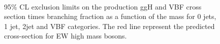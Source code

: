 \begin{figure}[htb]
\centering
{}
\\


\caption{95$\%$ CL exclusion limits on the production ggH and VBF cross section times branching fraction as a function of the mass for 0 jets, 1 jet, 2jet and VBF categories. The red  line represent the predicted cross-section for EW high mass bosons.}
    \label{fig:lim_OF}
\end{figure}
    


